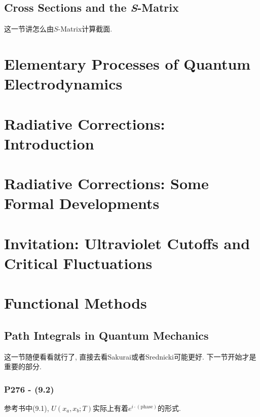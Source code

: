 \documentclass[cn,hazy,blue,11pt,device=normal,chinesefont=founder]{elegantnote}
\begin{document}
\subsection{Cross Sections and the \textit{S}-Matrix}

这一节讲怎么由$S$-Matrix计算截面. 

\subsubsection{}



\clearpage

\section{Elementary Processes of Quantum Electrodynamics}

\section{Radiative Corrections: Introduction}

\section{Radiative Corrections: Some Formal Developments}

\section{Invitation: Ultraviolet Cutoffs and Critical Fluctuations}

\clearpage

\section{Functional Methods}

\subsection{Path Integrals in Quantum Mechanics}

这一节随便看看就行了, 直接去看Sakurai或者Srednicki可能更好. 下一节开始才是重要的部分. 

\subsubsection{P276 - (9.2)}

参考书中(9.1), $U(x_a, x_b; T)$实际上有着$e^{i \cdot (\text{phase})}$的形式. 
\end{document}
